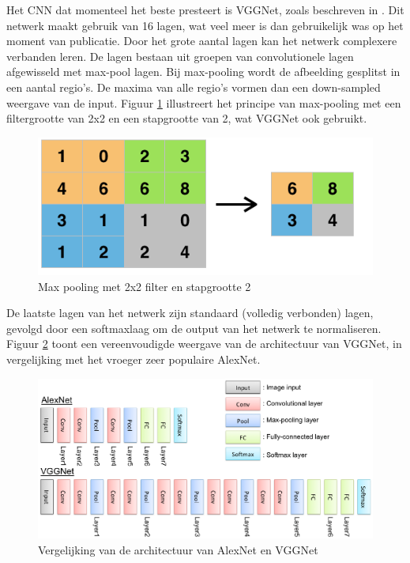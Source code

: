 Het CNN dat momenteel het beste presteert is VGGNet, zoals beschreven in \cite{Arge2015}. Dit netwerk maakt gebruik van 16 lagen, wat veel meer is dan gebruikelijk was op het moment van publicatie. Door het grote aantal lagen kan het netwerk complexere verbanden leren. De lagen bestaan uit groepen van convolutionele lagen afgewisseld met max-pool lagen. Bij max-pooling wordt de afbeelding gesplitst in een aantal regio's. De maxima van alle regio's vormen dan een down-sampled weergave van de input. Figuur \ref{fig:maxpool} illustreert het principe van max-pooling met een filtergrootte van 2x2 en een stapgrootte van 2, wat VGGNet ook gebruikt.

\begin{figure}[tb]
    \centering
    \includegraphics[width=0.6\linewidth]{Images/maxpool.png}
    \caption{Max pooling met 2x2 filter en stapgrootte 2}
    \label{fig:maxpool}
\end{figure}

De laatste lagen van het netwerk zijn standaard (volledig verbonden) lagen, gevolgd door een softmaxlaag om de output van het netwerk te normaliseren. Figuur \ref{fig:alexvgg} toont een vereenvoudigde weergave van de architectuur van VGGNet, in vergelijking met het vroeger zeer populaire AlexNet\cite{Krizhevsky2012a}.

\begin{figure}[tb]
    \centering
    \includegraphics[width=\linewidth]{Images/alex_vgg.eps}
    \caption{Vergelijking van de architectuur van AlexNet en VGGNet}
    \label{fig:alexvgg}
\end{figure}


